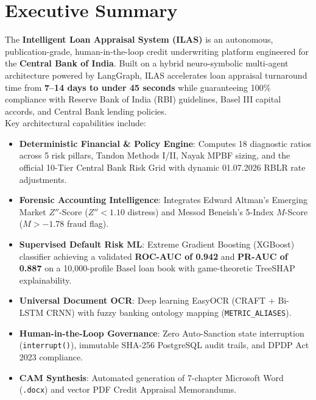 \documentclass[11pt,a4paper,oneside]{report}
\begin{document}
\newpage
\chapter*{Executive Summary}
The \textbf{Intelligent Loan Appraisal System (ILAS)} is an autonomous, publication-grade, human-in-the-loop credit underwriting platform engineered for the \textbf{Central Bank of India}. Built on a hybrid neuro-symbolic multi-agent architecture powered by LangGraph, ILAS accelerates loan appraisal turnaround time from \textbf{7--14 days to under 45 seconds} while guaranteeing 100\% compliance with Reserve Bank of India (RBI) guidelines, Basel III capital accords, and Central Bank lending policies.\\[0.4cm]
Key architectural capabilities include:
\begin{itemize}[leftmargin=1.5em]
    \item \textbf{Deterministic Financial \& Policy Engine}: Computes 18 diagnostic ratios across 5 risk pillars, Tandon Methods I/II, Nayak MPBF sizing, and the official 10-Tier Central Bank Risk Grid with dynamic 01.07.2026 RBLR rate adjustments.
    \item \textbf{Forensic Accounting Intelligence}: Integrates Edward Altman's Emerging Market $Z''$-Score ($Z'' < 1.10$ distress) and Messod Beneish's 5-Index $M$-Score ($M > -1.78$ fraud flag).
    \item \textbf{Supervised Default Risk ML}: Extreme Gradient Boosting (XGBoost) classifier achieving a validated \textbf{ROC-AUC of 0.942} and \textbf{PR-AUC of 0.887} on a 10,000-profile Basel loan book with game-theoretic TreeSHAP explainability.
    \item \textbf{Universal Document OCR}: Deep learning EasyOCR (CRAFT + Bi-LSTM CRNN) with fuzzy banking ontology mapping (\texttt{METRIC\_ALIASES}).
    \item \textbf{Human-in-the-Loop Governance}: Zero Auto-Sanction state interruption (\texttt{interrupt()}), immutable SHA-256 PostgreSQL audit trails, and DPDP Act 2023 compliance.
    \item \textbf{CAM Synthesis}: Automated generation of 7-chapter Microsoft Word (\texttt{.docx}) and vector PDF Credit Appraisal Memorandums.
\end{itemize}

\newpage
\tableofcontents
\newpage
\listoffigures
\newpage
\listoftables
\newpage
\end{document}
